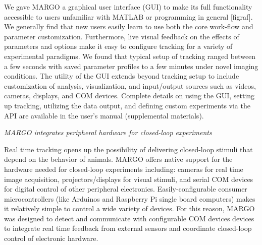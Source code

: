 \documentclass[10pt]{article}
\begin{document}
\begin{multicols}{2}
We gave MARGO a graphical user interface (GUI) to make its full functionality accessible to users unfamiliar with MATLAB or programming in general [figraf]. We generally find that new users easily learn to use both the core work-flow and parameter customization. Furthermore, live visual feedback on the effects of parameters and options make it easy to configure tracking for a variety of experimental paradigms. We found that typical setup of tracking ranged between a few seconds with saved parameter profiles to a few minutes under novel imaging conditions. The utility of the GUI extends beyond tracking setup to include customization of analysis, visualization, and input/output sources such as videos, cameras, displays, and COM devices. Complete details on using the GUI, setting up tracking, utilizing the data output, and defining custom experiments via the API are available in the user's manual (supplemental materials).


\textit{MARGO integrates peripheral hardware for closed-loop experiments}

Real time tracking opens up the possibility of delivering closed-loop stimuli that depend on the behavior of animals. MARGO offers native support for the hardware needed for closed-loop experiments including: cameras for real time image acquisition, projectors/displays for visual stimuli, and serial COM devices for digital control of other peripheral electronics. Easily-configurable consumer microcontrollers (like Arduinos and Raspberry Pi single board computers) makes it relatively simple to control a wide variety of devices. For this reason, MARGO was designed to detect and communicate with configurable COM devices devices to integrate real time feedback from external sensors and coordinate closed-loop control of electronic hardware. 


\end{multicols}
\end{document}
